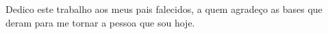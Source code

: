 Dedico este trabalho aos meus pais falecidos, a quem agradeço as bases que deram para me tornar a pessoa que sou hoje.
